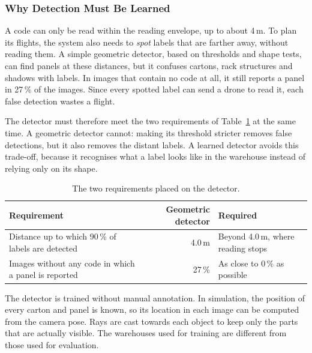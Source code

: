 \FloatBarrier

\subsubsection*{Why Detection Must Be Learned}

A code can only be read within the reading envelope, up to about 4\,m. To plan
its flights, the system also needs to \emph{spot} labels that are farther away,
without reading them. A simple geometric detector, based on thresholds and shape
tests, can find panels at these distances, but it confuses cartons, rack
structures and shadows with labels. In images that contain no
 code at all, it still reports a panel in 27\,\% of the
images. Since every spotted label can send a drone to read it, each false
detection wastes a flight.

The detector must therefore meet the two requirements of
Table~\ref{tab:sys:detectors} at the same time. A geometric detector cannot:
making its threshold stricter removes false detections, but it also removes the
distant labels. A learned detector avoids this trade-off, because it recognises
what a label looks like in the warehouse instead of relying only on its shape.

\begin{table}[!htb]
    \centering
    \caption{The two requirements placed on the detector.}%
    \label{tab:sys:detectors}
    \setlength{\tabcolsep}{4pt}
    \begin{tabular}{@{}>{\raggedright\arraybackslash}p{5.2cm}
            r
            >{\raggedright\arraybackslash}p{5.4cm}@{}}
        \toprule
        \textbf{Requirement} & \textbf{Geometric detector} & \textbf{Required} \\
        \midrule
        Distance up to which 90\,\% of labels are detected & 4.0\,m & Beyond 4.0\,m, where reading stops \\
        \addlinespace
        Images without any code in which a panel is reported & 27\,\% & As close to 0\,\% as possible \\
        \bottomrule
    \end{tabular}
\end{table}

\FloatBarrier

The detector is trained without manual annotation. In simulation, the position
of every carton and panel is known, so its location in each image can be computed
from the camera pose. Rays are cast towards each object to keep only the parts
that are actually visible. The warehouses used for training are different from
those used for evaluation.

